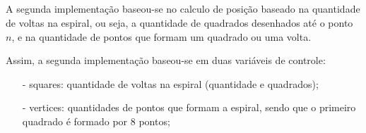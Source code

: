 \documentclass[12pt,a4paper]{article}
\begin{document}
    \subsection{}
        A segunda implementação baseou-se no calculo de posição baseado na quantidade de voltas na espiral, ou seja, a quantidade de quadrados desenhados até o ponto $n$, e na quantidade de pontos que formam um quadrado ou uma volta.
        
        Assim, a segunda implementação baseou-se em duas variáveis de controle:
        \begin{itemize}
        	\item[-] squares: quantidade de voltas na espiral (quantidade e quadrados);
        	\item[-] vertices: quantidades de pontos que formam a espiral, sendo que o primeiro quadrado é formado por 8 pontos;
    	\end{itemize}
    	
\end{document}
